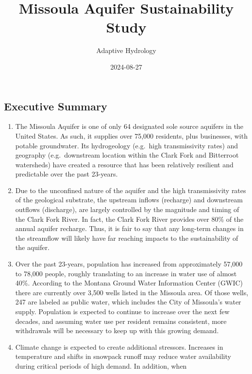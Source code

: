 \documentclass[
  letterpaper,
  DIV=11,
  numbers=noendperiod]{scrartcl}
\title{Missoula Aquifer Sustainability Study}
\author{Adaptive Hydrology}
\date{2024-08-27}
\providecommand{\tightlist}{%
  \setlength{\itemsep}{0pt}\setlength{\parskip}{0pt}}\usepackage{longtable,booktabs,array}
\begin{document}
\maketitle

\subsection{Executive Summary}\label{executive-summary}

\begin{enumerate}
\def\labelenumi{\arabic{enumi}.}
\tightlist
\item
  The Missoula Aquifer is one of only 64 designated sole source aquifers
  in the United States. As such, it supplies over 75,000 residents, plus
  businesses, with potable groundwater. Its hydrogeology (e.g.~high
  transmissivity rates) and geography (e.g.~downstream location within
  the Clark Fork and Bitterroot watersheds) have created a resource that
  has been relatively resilient and predictable over the past
  23-years.\\
\item
  Due to the unconfined nature of the aquifer and the high
  transmissivity rates of the geological substrate, the upstream inflows
  (recharge) and downstream outflows (discharge), are largely controlled
  by the magnitude and timing of the Clark Fork River. In fact, the
  Clark Fork River provides over 80\% of the annual aquifer recharge.
  Thus, it is fair to say that any long-term changes in the streamflow
  will likely have far reaching impacts to the sustainability of the
  aquifer.\\
\item
  Over the past 23-years, population has increased from approximately
  57,000 to 78,000 people, roughly translating to an increase in water
  use of almost 40\%. According to the Montana Ground Water Information
  Center (GWIC) there are currently over 3,500 wells listed in the
  Missoula area. Of those wells, 247 are labeled as public water, which
  includes the City of Missoula's water supply. Population is expected
  to continue to increase over the next few decades, and assuming water
  use per resident remains consistent, more withdrawals will be
  necessary to keep up with this growing demand.\\
\item
  Climate change is expected to create additional stressors. Increases
  in temperature and shifts in snowpack runoff may reduce water
  availability during critical periods of high demand. In addition, when

\end{enumerate}
\end{document}
